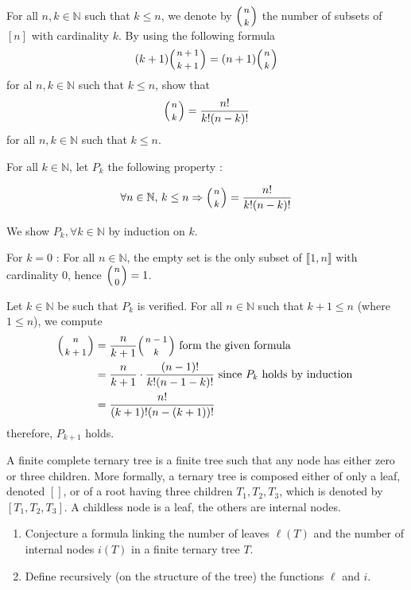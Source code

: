 \documentclass[a4paper,11pt]{exam}
\renewcommand{\binom}{\mbinom}
\newcommand{\N}{\mathbb{N}}
\begin{document}
\begin{questions}
		\question
		
		For all  $n,k \in \N$ such that $k \leq n$, we denote by $\binom{n}{k}$ the number of subsets of $[n]$ with cardinality $k$. By using the following formula
		$$(k+1) \binom{n+1}{k+1} = (n+1) \binom{n}{k}$$
		for al $n,k \in \N$ such that $k \leq n$, show that
		$$\binom{n}{k} = \frac{n!}{k!(n-k)!}$$
		for all $n,k \in \N$ such that $k \leq n$. 
		
		
		\begin{solution}
			For all $k \in \N$, let	 $P_k$ the following property : 
			
			$$\forall n \in \N,\, k \leq n \Rightarrow \binom{n}{k} = \frac{n!}{k!(n-k)!}$$
			
			We show $P_k,\forall k \in \N$ by induction on $k$.
			
			For $k = 0$ : For all $n \in \N$, the empty set is the only subset of $\llbracket 1,n\rrbracket$ with cardinality $0$, hence $\binom{n}{0} = 1$. 
			
			Let $k \in \N$ be such that $P_k$ is verified. For all $n \in \N$ such that $k+1 \leq n$ (where $1 \leq n$), we compute
			\begin{align*}
			\binom{n}{k+1} & =  \frac{n}{k+1} \binom{n-1}{k} \mbox{ form the given formula}\\
			& = \frac{n}{k+1} \cdot \frac{(n-1)!}{k!(n-1-k)!} \mbox{ since }P_k\mbox{ holds by induction }\\
			& = \frac{n!}{(k+1)!(n-(k+1))!}
			\end{align*}
			therefore, $P_{k+1}$ holds.
			
		\end{solution}
		
		\question
		A finite complete ternary tree is a finite tree such that any node has either zero or three children. More formally, a ternary tree is composed either of only a leaf, denoted $ [] $, or of a root having three children $ T_1, T_2, T_3 $, which is denoted by $ [T_1, T_2, T_3] $. A childless node is a leaf, the others are internal nodes.
		
		\begin{enumerate}
			\item Conjecture a formula linking the number of leaves $\ell(T)$ and the number of internal nodes $ i(T) $ in a finite ternary tree $ T $.
			
			\item Define recursively (on the structure of the tree) the functions $ \ell $ and $ i $.
			

\end{enumerate}
\end{questions}
\end{document}
